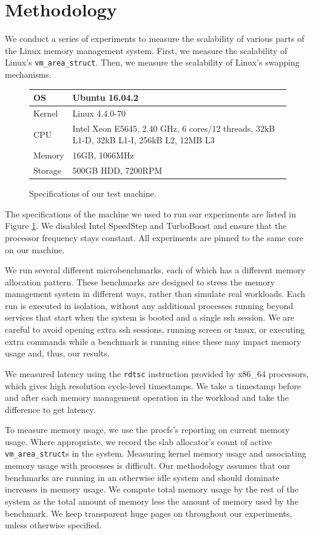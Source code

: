 \documentclass[twocolumn,11pt]{article}
\begin{document}
\section{Methodology}

We conduct a series of experiments to measure the scalability of various parts
of the Linux memory management system.  First, we measure the scalability of
Linux's \texttt{vm\_area\_struct}. Then, we measure the scalability of Linux's
swapping mechanisms.

\begin{figure}
\centering
\begin{tabular}{|l|p{5cm}|} \hline
OS & Ubuntu 16.04.2 \\ \hline
Kernel & Linux 4.4.0-70 \\ \hline
CPU & Intel Xeon E5645, 2.40 GHz, 6 cores/12 threads, 32kB L1-D, 32kB L1-I,
    256kB L2, 12MB L3 \\ \hline
Memory & 16GB, 1066MHz \\ \hline
Storage & 500GB HDD, 7200RPM \\
\hline
\end{tabular}
\caption{Specifications of our test machine.  \label{fig:specs}}
\end{figure}

The specifications of the machine we used to run our experiments are listed in
Figure \ref{fig:specs}. We disabled Intel SpeedStep and TurboBoost and ensure
that the processor frequency stays constant. All experiments are pinned to the
same core on our machine. 

We run several different microbenchmarks, each of which has a different memory
allocation pattern. These benchmarks are designed to stress the memory
management system in different ways, rather than simulate real workloads. 
Each run is executed in isolation, without any additional processes
running beyond services that start when the system is booted and a single ssh
session. We are careful to avoid opening extra ssh sessions, running screen or
tmux, or executing extra commands while a benchmark is running since these may
impact memory usage and, thus, our results.

We measured latency using the \texttt{rdtsc} instruction provided by x86\_64
processors, which gives high resolution cycle-level timestamps. We take a
timestamp before and after each memory management operation in the workload and
take the difference to get latency.

To measure memory usage, we use the procfs's reporting on current memory usage.
Where appropriate, we record the slab allocator's count of active
\texttt{vm\_area\_struct}s in the system. Measuring kernel memory usage and
associating memory usage with processes is difficult. Our methodology assumes
that our benchmarks are running in an otherwise idle system and should dominate
increases in memory usage.  We compute total memory usage by the rest of the
system as the total amount of memory less the amount of memory used by the
benchmark. We keep transparent huge pages on throughout our experiments, unless
otherwise specified.
\end{document}
